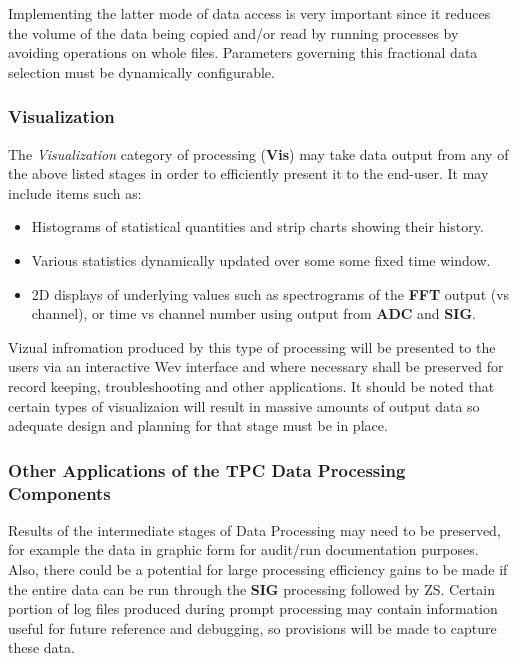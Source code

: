 \documentclass[pdftex,12pt,letter]{article}
\begin{document}
\noindent Implementing the latter mode of data access is very important since it reduces
the volume of the data being copied and/or read by running processes by avoiding
operations on whole files.
Parameters governing this fractional data selection must be dynamically configurable.


\subsubsection{Visualization}
\label{sec:viz_intro}

The \textit{Visualization} category of processing (\textbf{Vis})
 may take data output from any of the above listed stages in
order to efficiently present it to the end-user. 
It may include items such as:

\begin{itemize}

\item Histograms of statistical quantities and strip charts showing their history.

\item Various statistics dynamically updated over some some fixed time window.

\item 2D displays of underlying values such as spectrograms of the \textbf{FFT}
  output (vs channel), or time vs channel number using output from \textbf{ADC} and \textbf{SIG}.

\end{itemize}

\noindent Vizual infromation produced by this type of processing will be presented to the users
via an interactive Wev interface and where necessary shall be preserved for record keeping,
troubleshooting and other applications. It should be noted that certain types of visualizaion
will result in massive amounts of output data so adequate design and planning for that stage
must be in place.

\subsubsection{Other Applications of the TPC Data Processing Components}
Results of the intermediate stages of Data Processing may need to be preserved, for
example the data in graphic form for audit/run documentation purposes.
Also, there could be a potential for large processing efficiency
gains to be made if the entire data can be run through the \textbf{SIG} processing followed by ZS.
Certain portion of log files produced during prompt processing may contain information useful
for future reference and debugging, so provisions will be made to capture these data.
\end{document}
